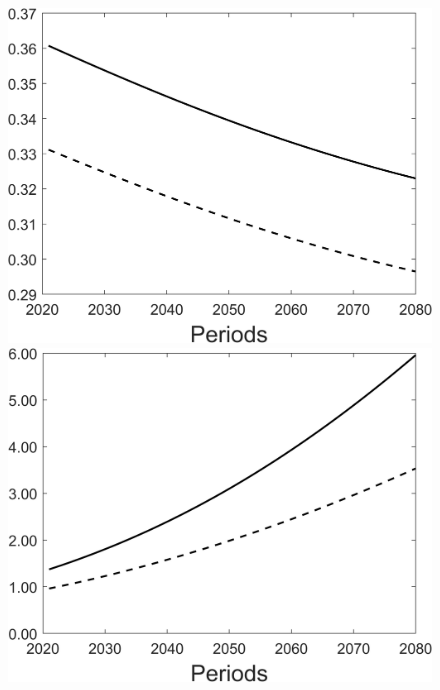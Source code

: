 \begin{figure}[h!!]
\begin{minipage}[]{0.32\textwidth}
	\end{minipage}
	\begin{minipage}[]{0.32\textwidth}
		\includegraphics[width=1\textwidth]{../../codding_model/Own/figures/Rep_agent/staticRam_LF_separate_hl_periods59_eppsilon0.40_zeta1.40_Ad08_Ac04_thetac0.70_thetad0.56_HetGrowth1_tauul0.181_util0_withtarget0_lgd0.png}
	\end{minipage}
	\begin{minipage}[]{0.32\textwidth}
		\includegraphics[width=1\textwidth]{../../codding_model/Own/figures/Rep_agent/staticRam_LF_separate_yc_periods59_eppsilon0.40_zeta1.40_Ad08_Ac04_thetac0.70_thetad0.56_HetGrowth1_tauul0.181_util0_withtarget0_lgd0.png}

\end{minipage}
\end{figure}
